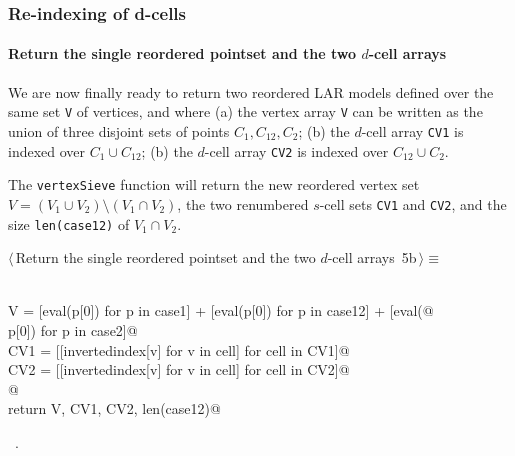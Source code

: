 \documentclass[11pt,oneside]{article}	%
\begin{document}
\subsubsection{Re-indexing of d-cells}

\paragraph{Return the single reordered pointset and the two $d$-cell arrays}
We are now finally ready to return two reordered LAR models defined over the same set \texttt{V} of vertices, and where (a) the vertex array \texttt{V} can be written as the union of three disjoint sets of points $C_1,C_{12},C_2$; (b) the $d$-cell array \texttt{CV1} is indexed over $C_1\cup C_{12}$; (b) the $d$-cell array \texttt{CV2} is indexed over $C_{12}\cup C_{2}$. 

The \texttt{vertexSieve} function will return the new reordered vertex set $V = (V_1 \cup V_2) \setminus (V_1 \cap V_2)$, the two renumbered $s$-cell sets \texttt{CV1} and \texttt{CV2}, and the size \texttt{len(case12)} of $V_1 \cap V_2$.
\begin{flushleft} \small \label{scrap8}
\protect{}$\langle\,$Return the single reordered pointset and the two $d$-cell arrays\nobreak\ {\footnotesize 5b}$\,\rangle\equiv$
\vspace{-1ex}
\begin{list}{}{} \item
\mbox{}\verb@@\\
\mbox{}\verb@   V = [eval(p[0]) for p in case1] + [eval(p[0]) for p in case12] + [eval(@\\
\mbox{}\verb@            p[0]) for p in case2]@\\
\mbox{}\verb@   CV1 = [[invertedindex[v] for v in cell] for cell in CV1]@\\
\mbox{}\verb@   CV2 = [[invertedindex[v] for v in cell] for cell in CV2]@\\
\mbox{}\verb@   @\\
\mbox{}\verb@   return V, CV1, CV2, len(case12)@\\
\mbox{}\verb@@{\NWsep}
\end{list}
\vspace{-1ex}
\footnotesize\addtolength{\baselineskip}{-1ex}
\begin{list}{}{\setlength{\itemsep}{-\parsep}\setlength{\itemindent}{-\leftmargin}}
\item \NWtxtMacroRefIn\ .
\end{list}
\end{flushleft}
\end{document}
